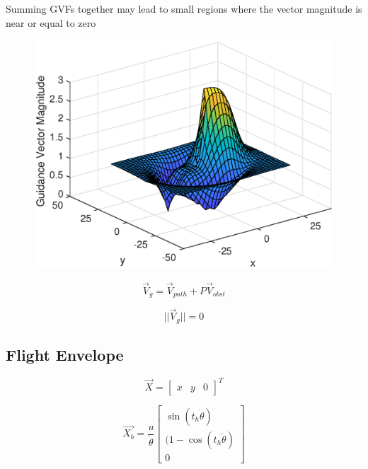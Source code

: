 \documentclass[conf]{new-aiaa}
\begin{document}
Summing GVFs together may lead to small regions where the vector magnitude is near or equal to zero


\begin{figure}[H]
	\centering
	\includegraphics[width=0.7\linewidth]{Figures/methods/summedMagnitudeSurf}
	\caption{}
	\label{fig:summedmagnitudesurf}
\end{figure}



\begin{equation}
\label{eq:singularityCondition}
\overrightarrow{V}_g = \overrightarrow{V}_{path} + P\overrightarrow{V}_{obst}
\end{equation}

\begin{equation}
\label{eq:singularityCondition}
||\overrightarrow{V}_g || = 0
\end{equation}

\subsection{Flight Envelope}

\begin{equation}
\label{eq:pos}
\overrightarrow{X} = \begin{bmatrix}
x & y & 0
\end{bmatrix}^T
\end{equation}


\begin{equation}
\label{eq:pos}
\overrightarrow{X_b} = \frac{u}{\dot{\theta}}\begin{bmatrix}
\sin(t_h \dot{\theta}) \\
(1-\cos(t_h \dot{\theta}) \\
0
\end{bmatrix}
\end{equation}
\end{document}
